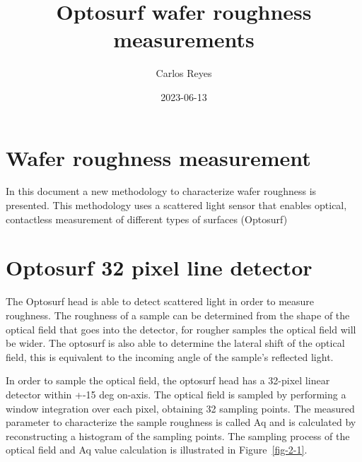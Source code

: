 \documentclass[
  letterpaper,
  DIV=11,
  numbers=noendperiod,
  oneside]{scrreprt}
\title{Optosurf wafer roughness measurements}
\author{Carlos Reyes}
\date{2023-06-13}
\renewcommand*\contentsname{Table of contents}
\newcommand\contentsname{Table of contents}
\begin{document}
\maketitle
\ifdefined\Shaded\renewenvironment{Shaded}{\begin{tcolorbox}[boxrule=0pt, frame hidden, interior hidden, borderline west={3pt}{0pt}{shadecolor}, enhanced, breakable, sharp corners]}{\end{tcolorbox}}\fi

\renewcommand*\contentsname{Table of contents}
{
\hypersetup{linkcolor=}
\setcounter{tocdepth}{2}
\tableofcontents
}

\hypertarget{wafer-roughness-measurement}{%
\chapter{Wafer roughness
measurement}\label{wafer-roughness-measurement}}

In this document a new methodology to characterize wafer roughness is
presented. This methodology uses a scattered light sensor that enables
optical, contactless measurement of different types of surfaces
(Optosurf)

\newpage


\hypertarget{optosurf-32-pixel-line-detector}{%
\chapter{Optosurf 32 pixel line
detector}\label{optosurf-32-pixel-line-detector}}

The Optosurf head is able to detect scattered light in order to measure
roughness. The roughness of a sample can be determined from the shape of
the optical field that goes into the detector, for rougher samples the
optical field will be wider. The optosurf is also able to determine the
lateral shift of the optical field, this is equivalent to the incoming
angle of the sample's reflected light.

In order to sample the optical field, the optosurf head has a 32-pixel
linear detector within +-15 deg on-axis. The optical field is sampled by
performing a window integration over each pixel, obtaining 32 sampling
points. The measured parameter to characterize the sample roughness is
called {Aq} and is calculated by reconstructing a histogram of the
sampling points. The sampling process of the optical field and Aq value
calculation is illustrated in Figure~\ref{fig-2-1}.
\end{document}
